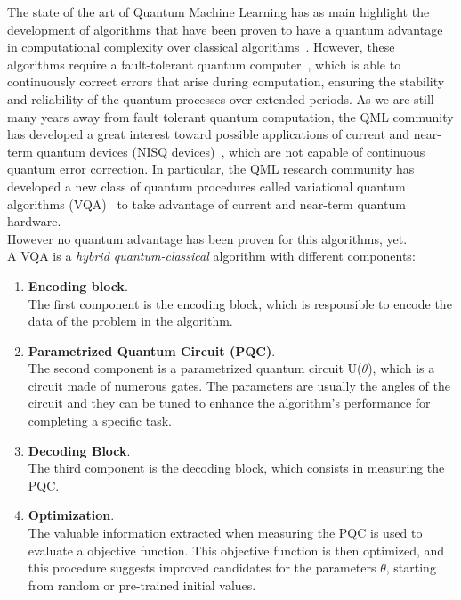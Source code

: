 The state of the art of Quantum Machine Learning has as main highlight the development
of algorithms that have been proven to have a quantum advantage in computational
complexity over classical algorithms~\cite{Sweke_2021, Liu_2021, Jerbi_2021}.
However, these algorithms require a fault-tolerant quantum computer~\cite{shor}, which is able to
continuously correct errors that arise during computation, ensuring the stability and
reliability of the quantum processes over extended periods.
As we are still many years away from fault tolerant quantum computation, the QML
community has developed a great interest toward possible applications of current and
near-term quantum devices (NISQ devices)~\cite{Preskill_2018}, which are not capable of continuous
quantum error correction.
In particular, the QML research community has developed a new class of quantum
procedures called variational quantum algorithms (VQA)~\cite{Cerezo_2021} to take advantage of current
and near-term quantum hardware.\\
However no quantum advantage has been proven for this algorithms, yet.\\

A VQA is a \textit{hybrid quantum-classical} algorithm with different components:

\begin{enumerate}
    \item \textbf{Encoding block}.\\
    The first component is the encoding block, which is responsible to encode the data of the problem in the 
    algorithm.
    \item \textbf{Parametrized Quantum Circuit (PQC)}.\\
    The second component is a parametrized quantum circuit U($\theta$), which is a circuit made of numerous gates. The parameters are usually 
    the angles of the circuit and they can be tuned to enhance the algorithm's performance for completing a specific task. 
    \item \textbf{Decoding Block}.\\
    The third component is the decoding block, which consists in measuring the PQC.
    \item \textbf{Optimization}.\\
    The valuable information extracted when measuring the PQC is used to evaluate a objective function.
    This objective function is then optimized, and this procedure suggests improved candidates 
    for the parameters $\theta$, starting from random or pre-trained initial values.
\end{enumerate}

